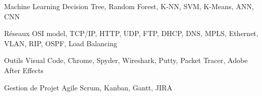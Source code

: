 \begin{cvskills}

\cvskill
    {Machine Learning} %
    {Decision Tree, Random Forest, K-NN, SVM, K-Means, ANN, CNN } %

 \cvskill
    {Réseaux} %
    {OSI model, TCP/IP, HTTP, UDP, FTP, DHCP, DNS, MPLS, Ethernet, VLAN, RIP, OSPF, Load Balancing   } %

\cvskill
    {Outils} %
    {Visual Code, Chrome, Spyder, Wireshark, Putty, Packet Tracer, Adobe After Effects  } %


\cvskill
    {Gestion de Projet} %
    {Agile Scrum, Kanban, Gantt, JIRA } %

\end{cvskills}
